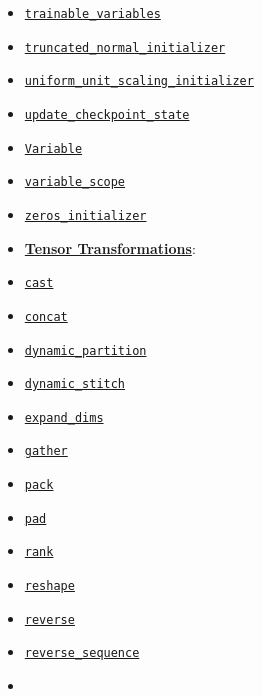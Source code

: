 \begin{itemize}
\item
  \href{../../api_docs/python/state_ops.md\#trainable_variables}{\texttt{trainable\_variables}}
\item
  \href{../../api_docs/python/state_ops.md\#truncated_normal_initializer}{\texttt{truncated\_normal\_initializer}}
\item
  \href{../../api_docs/python/state_ops.md\#uniform_unit_scaling_initializer}{\texttt{uniform\_unit\_scaling\_initializer}}
\item
  \href{../../api_docs/python/state_ops.md\#update_checkpoint_state}{\texttt{update\_checkpoint\_state}}
\item
  \href{../../api_docs/python/state_ops.md\#Variable}{\texttt{Variable}}
\item
  \href{../../api_docs/python/state_ops.md\#variable_scope}{\texttt{variable\_scope}}
\item
  \href{../../api_docs/python/state_ops.md\#zeros_initializer}{\texttt{zeros\_initializer}}
\item
  \textbf{\href{../../api_docs/python/array_ops.md}{Tensor
  Transformations}}:
\item
  \href{../../api_docs/python/array_ops.md\#cast}{\texttt{cast}}
\item
  \href{../../api_docs/python/array_ops.md\#concat}{\texttt{concat}}
\item
  \href{../../api_docs/python/array_ops.md\#dynamic_partition}{\texttt{dynamic\_partition}}
\item
  \href{../../api_docs/python/array_ops.md\#dynamic_stitch}{\texttt{dynamic\_stitch}}
\item
  \href{../../api_docs/python/array_ops.md\#expand_dims}{\texttt{expand\_dims}}
\item
  \href{../../api_docs/python/array_ops.md\#gather}{\texttt{gather}}
\item
  \href{../../api_docs/python/array_ops.md\#pack}{\texttt{pack}}
\item
  \href{../../api_docs/python/array_ops.md\#pad}{\texttt{pad}}
\item
  \href{../../api_docs/python/array_ops.md\#rank}{\texttt{rank}}
\item
  \href{../../api_docs/python/array_ops.md\#reshape}{\texttt{reshape}}
\item
  \href{../../api_docs/python/array_ops.md\#reverse}{\texttt{reverse}}
\item
  \href{../../api_docs/python/array_ops.md\#reverse_sequence}{\texttt{reverse\_sequence}}
\item

\end{itemize}
